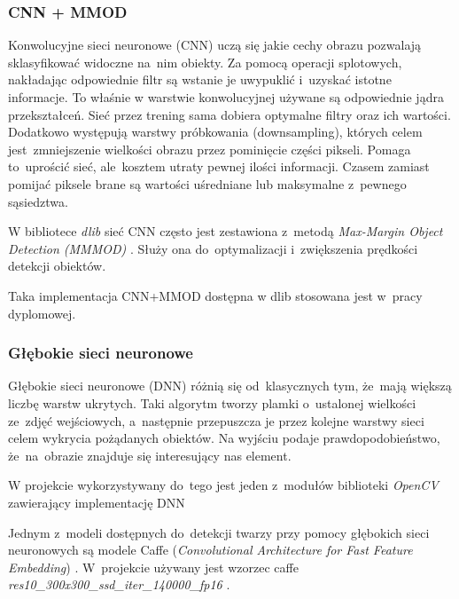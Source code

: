 \subsubsection{CNN + MMOD}

Konwolucyjne sieci neuronowe (CNN) uczą się jakie cechy obrazu pozwalają sklasyfikować widoczne na~nim obiekty. Za pomocą operacji splotowych, nakładając odpowiednie filtr są wstanie je uwypuklić i~uzyskać istotne informacje. To właśnie w warstwie konwolucyjnej używane są odpowiednie jądra przekształceń. Sieć przez trening sama dobiera optymalne filtry oraz ich wartości. Dodatkowo występują warstwy próbkowania (downsampling), których celem jest~zmniejszenie wielkości obrazu przez pominięcie części pikseli. Pomaga to~uprościć sieć, ale~kosztem utraty pewnej ilości informacji. Czasem zamiast pomijać piksele brane są wartości uśredniane lub maksymalne z~pewnego sąsiedztwa. \cite{jak_cnn}

\vspace{5mm}

W bibliotece \textit{dlib} sieć CNN często jest zestawiona z~metodą \textit{Max-Margin Object Detection (MMMOD)} \cite{mmod}. Służy ona do~optymalizacji i~zwiększenia prędkości detekcji obiektów.

\par

Taka implementacja CNN+MMOD dostępna w dlib stosowana jest w~pracy dyplomowej.



\subsubsection{Głębokie sieci neuronowe}


Głębokie sieci neuronowe (DNN) różnią się od~klasycznych tym, że~mają większą liczbę warstw ukrytych. Taki algorytm tworzy plamki o~ustalonej wielkości ze~zdjęć wejściowych, a~następnie przepuszcza je przez kolejne warstwy sieci celem wykrycia pożądanych obiektów. Na wyjściu podaje prawdopodobieństwo, że~na~obrazie znajduje się interesujący nas element.

\par

W projekcie wykorzystywany do~tego jest jeden z~modułów biblioteki \textit{OpenCV} zawierający implementację DNN \cite{opencv_dnn}

\par

Jednym z~modeli dostępnych do~detekcji twarzy przy pomocy głębokich sieci neuronowych są modele Caffe (\textit{Convolutional Architecture for Fast Feature Embedding}) \cite{jia2014caffe}. W~projekcie używany jest wzorzec caffe \textit{res10{\_}300x300{\_}ssd{\_}iter{\_}140000{\_}fp16} \cite{caffemodel_res10}.


